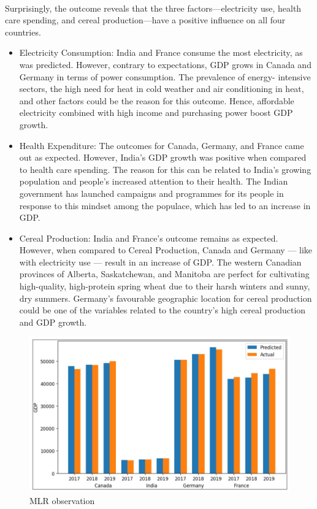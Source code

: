 \documentclass[conference]{IEEEtran}
\begin{document}
\\
Surprisingly, the outcome reveals that the three factors—electricity use, health care spending, and cereal production—have a positive influence on all four countries.
\begin{itemize}
    \item Electricity Consumption: India and France consume the most electricity, as was predicted. However, contrary to expectations, GDP grows in Canada and Germany in terms of power consumption. The prevalence of energy- intensive sectors, the high need for heat in cold weather and air conditioning in heat, and other factors could be the reason for this outcome. Hence, affordable electricity combined with high income and purchasing power boost GDP growth.
    \item Health Expenditure: The outcomes for Canada, Germany, and France came out as expected. However, India's GDP growth was positive when compared to health care spending. The reason for this can be related to India's growing population and people's increased attention to their health. The Indian government has launched campaigns and programmes for its people in response to this mindset among the populace, which has led to an increase in GDP.
    \item Cereal Production: India and France's outcome remains as expected. However, when compared to Cereal Production, Canada and Germany — like with electricity use — result in an increase of GDP. The western Canadian provinces of Alberta, Saskatchewan, and Manitoba are perfect for cultivating high-quality, high-protein spring wheat due to their harsh winters and sunny, dry summers. Germany's favourable
          geographic location for cereal production could be one of the variables related to the country's high cereal production and GDP growth.
\end{itemize}
\begin{figure}[htbp]
    \centerline{\includegraphics[scale=0.5]{mlr1.jpg}}
    \caption{MLR observation}
\end{figure}
\end{document}
